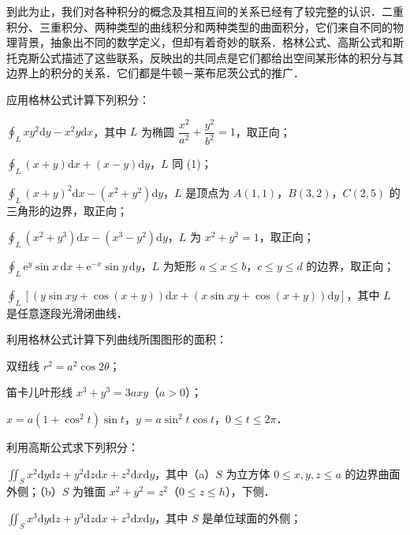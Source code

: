 到此为止，我们对各种积分的概念及其相互间的关系已经有了较完整的认识．二重积分、三重积分、两种类型的曲线积分和两种类型的曲面积分，它们来自不同的物理背景，抽象出不同的数学定义，但却有着奇妙的联系．格林公式、高斯公式和斯托克斯公式描述了这些联系，反映出的共同点是它们都给出空间某形体的积分与其边界上的积分的关系．它们都是牛顿－莱布尼茨公式的推广．

\begin{xiti}
\item 应用格林公式计算下列积分：
\begin{ziti}
\item $\displaystyle\oint_{L}xy^{2}\mathrm{d}y-x^{2}y\mathrm{d}x$，其中 $L$ 为椭圆 $\dfrac{x^{2}}{a^{2}}+\dfrac{y^{2}}{b^{2}}=1$，取正向；
\item $\displaystyle\oint_{L}(x+y)\mathrm{d}x+(x-y)\mathrm{d}y$，$L$ 同 (1)；
\item $\displaystyle\oint_{L}(x+y)^{2}\mathrm{d}x-(x^{2}+y^{2})\mathrm{d}y$，$L$ 是顶点为 $A(1,1)$，$B(3,2)$，$C(2,5)$ 的三角形的边界，取正向；
\item $\displaystyle\oint_{L}(x^{2}+y^{3})\mathrm{d}x-(x^{3}-y^{2})\mathrm{d}y$，$L$ 为 $x^{2}+y^{2}=1$，取正向；
\item $\displaystyle\oint_{L}\mathrm{e}^{y}\sin x\,\mathrm{d}x+\mathrm{e}^{-x}\sin y\,\mathrm{d}y$，$L$ 为矩形 $a\leqslant x\leqslant b$，$c\leqslant y\leqslant d$ 的边界，取正向；
\item $\displaystyle\oint_{L}\left[\left(y\sin xy+\cos(x+y)\right)\mathrm{d}x+\left(x\sin xy+\cos(x+y)\right)\mathrm{d}y\right]$，其中 $L$ 是任意逐段光滑闭曲线．
\end{ziti}
\item 利用格林公式计算下列曲线所围图形的面积：
\begin{ziti}
\item 双纽线 $r^{2}=a^{2}\cos 2\theta$；
\item 笛卡儿叶形线 $x^{3}+y^{3}=3axy$（$a>0$）；
\item $x=a(1+\cos^{2}t)\sin t$，$y=a\sin^{2}t\cos t$，$0\leqslant t\leqslant 2\pi$．
\end{ziti}
\item 利用高斯公式求下列积分：
\begin{ziti}
\item $\displaystyle\iint_{S}x^{2}\mathrm{d}y\mathrm{d}z+y^{2}\mathrm{d}z\mathrm{d}x+z^{2}\mathrm{d}x\mathrm{d}y$，其中（a）$S$ 为立方体 $0\leqslant x,y,z\leqslant a$ 的边界曲面外侧；（b）$S$ 为锥面 $x^{2}+y^{2}=z^{2}$（$0\leqslant z\leqslant h$），下侧．
\item $\displaystyle\iint_{S}x^{3}\mathrm{d}y\mathrm{d}z+y^{3}\mathrm{d}z\mathrm{d}x+z^{3}\mathrm{d}x\mathrm{d}y$，其中 $S$ 是单位球面的外侧；

\end{ziti}
\end{xiti}
